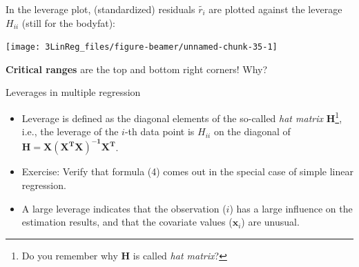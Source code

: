 \documentclass[
  10pt,
  ignorenonframetext,
]{beamer}
\providecommand{\tightlist}{%
  \setlength{\itemsep}{0pt}\setlength{\parskip}{0pt}}
\begin{document}
\begin{frame}
In the leverage plot, (standardized) residuals \(\tilde{r_i}\) are
plotted against the leverage \(H_{ii}\) (still for the bodyfat):

\begin{center}\texttt{[image: 3LinReg\_files/figure-beamer/unnamed-chunk-35-1]} \end{center}

\textbf{Critical ranges} are the top and bottom right corners! Why?
\end{frame}

\begin{frame}
\begin{block}{Leverages in multiple regression}
\protect\hypertarget{leverages-in-multiple-regression}{}
\vspace{3mm}

\begin{itemize}
\tightlist
\item
  Leverage is defined as the diagonal elements of the so-called
  \emph{hat matrix}
  \(\mathbf{H}\)\footnote{Do you remember why $\mathbf{H}$ is called \emph{hat matrix}?},
  i.e., the leverage of the \(i\)-th data point is \(H_{ii}\) on the
  diagonal of \(\mathbf{H = X(X^TX)^{-1}X^T}\).
\end{itemize}

\vspace{40mm}

\begin{itemize}
\tightlist
\item
  Exercise: Verify that formula (4) comes out in the special case of
  simple linear regression.
\end{itemize}

\vspace{1mm}

\begin{itemize}
\tightlist
\item
  A large leverage indicates that the observation (\(i\)) has a large
  influence on the estimation results, and that the covariate values
  (\({\boldsymbol x}_i\)) are unusual.
\end{itemize}
\end{block}
\end{frame}
\end{document}
